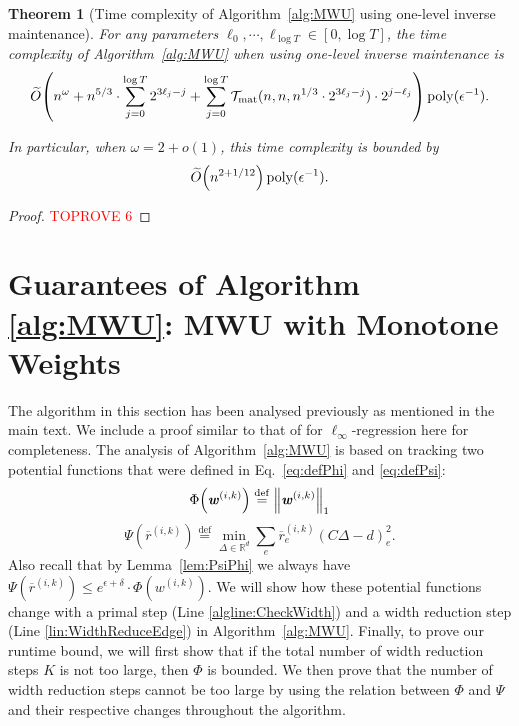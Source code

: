 \documentclass[11pt]{article}
\newcommand{\defeq}{\stackrel{\textup{def}}{=}}
\newtheorem{theorem}{Theorem}[section]
\renewcommand{\norm}[1]{\ensuremath{\left\lVert #1 \right\rVert}}
\newcommand\rea{\mathbb{R}}
\newcommand{\Tmat}{\mathcal{T}_{\mathrm{mat}}}
\let\originalleft\left
\let\originalright\right
\renewcommand{\left}{\mathopen{}\mathclose\bgroup\originalleft}
\renewcommand{\right}{\aftergroup\egroup\originalright}
\def\defeq{\stackrel{\mathrm{def}}{=}}
\newcommand\dd{\boldsymbol{\mathit{d}}}
\newcommand\ww{\boldsymbol{\mathit{w}}}
\newcommand\rrbar{\overline{\boldsymbol{\mathit{r}}}}
\newcommand\CC{\boldsymbol{\mathit{C}}}
\newcommand{\wt}{\widetilde}
\DeclareMathOperator*{\poly}{{\mathrm{poly}}}
\begin{document}
\begin{theorem}[Time complexity of Algorithm~\ref{alg:MWU} using one-level inverse maintenance]\label{thm:time_deterministic}
For any parameters $\ell_0, \cdots, \ell_{\log T} \in [0,\log T]$, the time complexity of Algorithm~\ref{alg:MWU} when using one-level inverse maintenance is
\begin{align*}
\wt{O}\left(n^{\omega} + n^{5/3} \cdot \sum_{j=0}^{\log T} 2^{3 \ell_j - j} + \sum_{j=0}^{\log T} \Tmat(n,n, n^{1/3} \cdot 2^{3 \ell_j - j}) \cdot 2^{j - \ell_j}\right) \poly(\epsilon^{-1}).
\end{align*}

In particular, when $\omega = 2 + o(1)$, this time complexity is bounded by
\[
\wt{O}\left(n^{2+1/12} \right) \poly(\epsilon^{-1}).
\]
\end{theorem}

\begin{proof}\textcolor{red}{TOPROVE 6}\end{proof} 





\section{Guarantees of Algorithm \ref{alg:MWU}: MWU with Monotone Weights}\label{sec:MWUMonotone}

The algorithm in this section has been analysed previously as mentioned in the main text. We include a proof similar to that of \cite{adil2022fast} for $\ell_{\infty}$-regression here for completeness. The analysis of Algorithm~\ref{alg:MWU} is based on tracking two potential functions that were defined in Eq.~\eqref{eq:defPhi} and \eqref{eq:defPsi}: 
\begin{equation*}\Phi\left(\ww^{( i,k )} \right) \defeq \norm{\ww^{(i,k)}}_1
\end{equation*}
\begin{equation*}\Psi(\rrbar^{(i,k)})\defeq \min_{\Delta\in \rea^d }\sum_e \rrbar^{(i,k)}_e (\CC\Delta-\dd)^2_e.
\end{equation*}
Also recall that by Lemma~\ref{lem:PsiPhi} we always have $\Psi(\rrbar^{(i,k)}) \leq e^{\epsilon+\delta} \cdot \Phi(\ww^{(i,k)})$. 
We will show how these potential functions change with a primal step (Line \ref{algline:CheckWidth}) and a width reduction step (Line \ref{lin:WidthReduceEdge}) in Algorithm~\ref{alg:MWU}. 
Finally, to prove our runtime bound, we will first show that if the total number of width reduction steps $K$ is not too large, then $\Phi$ is bounded. We then prove that the number of width reduction steps cannot be too large by using the relation between $\Phi$ and $\Psi$ and their respective changes throughout the algorithm.
\end{document}

